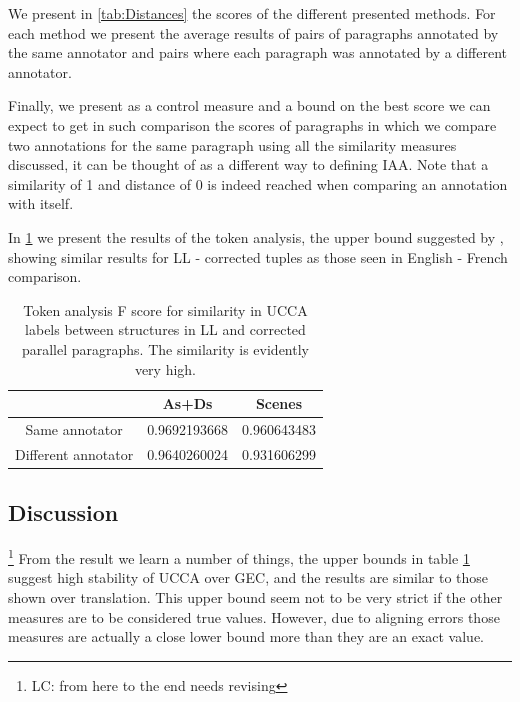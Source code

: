 \documentclass[letter,11pt]{article}
\newcommand{\lc}[1]{\footnote{\color{green}LC: #1}}
\begin{document}
	We present in \ref{tab:Distances} the scores of the different presented
	methods. For each method we present the average results of pairs
	of paragraphs annotated by the same annotator and pairs where each
	paragraph was annotated by a different annotator.
	
	Finally, we present as a control measure and a bound on the best score
	we can expect to get in such comparison the scores of paragraphs
	in which we compare two annotations for the same paragraph using all
	the similarity measures discussed, it can be thought of as a different
	way to defining IAA. Note that a similarity
	of 1 and distance of 0 is indeed reached when comparing an annotation with itself.
	
	In \ref{tab:Token_analysis} we present the results of the token analysis, the
	upper bound suggested by \cite{sulem2015conceptual}, showing similar
	results for LL - corrected tuples as those seen in English
	- French comparison.
		
		\begin{table}[h!]
			\centering
			\begin{tabular}{c|c|c}
				& As+Ds & Scenes\\
				\hline
				Same annotator & 0.9692193668 & 0.960643483\\
				Different annotator & 0.9640260024
				 & 0.931606299
				 \\
				\end{tabular}
				\caption{Token analysis F score for similarity in UCCA labels between structures in LL and corrected parallel paragraphs. The similarity is evidently very high.\label{tab:Token_analysis}}
				\end{table}
				
	\subsection{Discussion}
		\lc{from here to the end needs revising}
	From the result we learn a number of things, the upper
	bounds in table \ref{tab:Token_analysis} suggest high stability of UCCA over GEC, and the results are similar to those shown over
	translation. This upper bound seem not to be very strict if the other
	measures are to be considered true values. 
	However, due to aligning errors those measures are actually a close lower bound more than they are an exact value.
	
\end{document}
